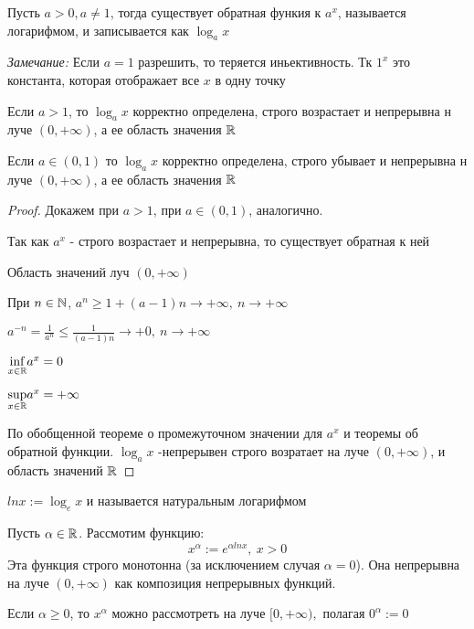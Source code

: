 \begin{definition}
Пусть $a > 0, a \neq 1$, тогда существует обратная функия к $a^x$, называется логарифмом, и записывается как $\log_a x$

\textit{Замечание:} Если $a = 1$ разрешить, то теряется иньективность. Тк $1^x$ это константа, которая отображает все $x$ в одну точку
\end{definition}

\begin{theorem} 
Если $a > 1$, то $\log_a x$ корректно определена, строго возрастает и непрерывна н луче $(0, +\infty)$, а ее область значения $\mathbb{R}$ 

Если $a \in (0, 1)$ то $\log_a x$ корректно определена, строго убывает и непрерывна н луче $(0, +\infty)$, а ее область значения $\mathbb{R}$ 
\end{theorem}

\begin{proof}  
Докажем при $a > 1$, при $a \in (0, 1)$, аналогично.

Так как $a^x$ - строго возрастает и непрерывна, то существует обратная к ней

Область значений луч $(0, +\infty)$

При  $n \in \mathbb{N}$, $a^n \geq 1 + (a - 1)n \to + \infty, \ n \to + \infty$ 

$a^{-n} = \frac{1}{a^n} \leq \frac{1}{(a - 1)n} \to + 0, \ n \to + \infty$ 

$\underset{x \in \mathbb{R}}{\inf} a^x = 0$


$\underset{x \in \mathbb{R}}{\sup} a^x = + \infty$

По обобщенной теореме о промежуточном значении для $a^x$ и теоремы об обратной функции. $\log_a x$ -непрерывен строго возратает на луче $(0, +\infty)$, и область значений $\mathbb{R}$
\end{proof}

\begin{definition}
$ln x := \log_e x$ и называется натуральным логарифмом
\end{definition}

\begin{definition}
    Пусть $\alpha \in \mathbb{R}$. Рассмотим функцию:
    $$ x^{\alpha} := e^{\alpha ln x}, \ x> 0
    $$
    Эта функция строго монотонна (за исключением случая $\alpha = 0$). Она непрерывна на луче $(0, +\infty)$ как композиция непрерывных функций.
    
    Если $\alpha \geq 0$, то $x^{\alpha}$ можно рассмотреть на луче $[0, +\infty),$ полагая $0^{\alpha} := 0$
\end{definition}

